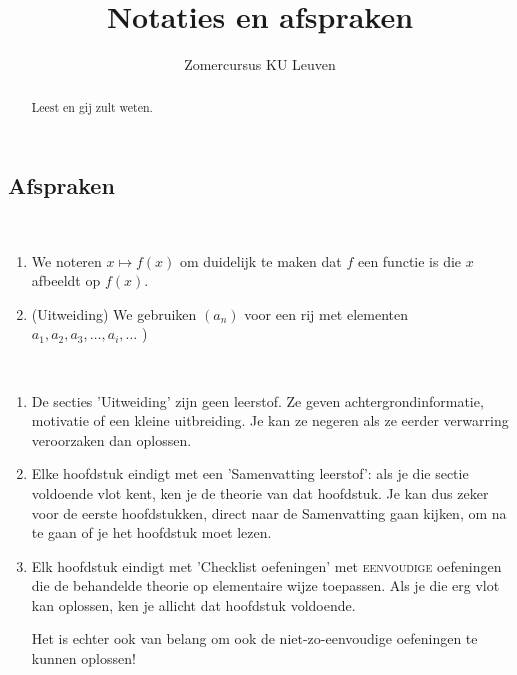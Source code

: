 \documentclass{ximera}
\author{Zomercursus KU Leuven}
\title[Rekenvaardigheden:]{Notaties en afspraken}
\begin{document}
\begin{abstract}
	Leest en gij zult weten.
\end{abstract}
\maketitle

\subsection{Afspraken }

\begin{notation}\ 
	
	\begin{enumerate}
		\item We noteren $x\mapsto f(x)$ om duidelijk te maken dat $f$ een functie is die $x$ afbeeldt op $f(x)$.
		\item (Uitweiding) We gebruiken $(a_n)$ voor een rij met elementen $a_1,a_2,a_3,\dots,a_i,\dots$  )
	\end{enumerate}
\end{notation}

\begin{remark} \ 
	
	\begin{enumerate}
		\item De secties 'Uitweiding' zijn geen leerstof. Ze geven achtergrondinformatie, motivatie of een kleine uitbreiding. Je kan ze negeren als ze eerder verwarring veroorzaken dan oplossen.
		\item Elke hoofdstuk eindigt met een 'Samenvatting leerstof': als je die sectie voldoende vlot kent, ken je de theorie van dat hoofdstuk. Je kan dus zeker voor de eerste hoofdstukken, direct naar de Samenvatting gaan kijken, om na te gaan of je het hoofdstuk moet lezen.
		\item Elk hoofdstuk eindigt met 'Checklist oefeningen' met \textsc{eenvoudige} oefeningen die de behandelde theorie op elementaire wijze toepassen. Als je die erg vlot kan oplossen, ken je allicht dat hoofdstuk voldoende. 
		
		Het is echter ook van belang om ook de niet-zo-eenvoudige oefeningen te kunnen oplossen! 
		
	\end{enumerate}
\end{remark}
\end{document}
